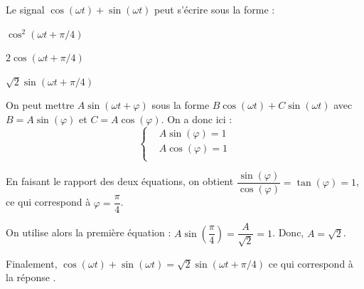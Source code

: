 \hauteurLargeurCadreReponse		{8mm}{1.5cm}
\initialisationEntrainement

Le signal $\cos(\omega t)+\sin(\omega t)$ peut s'écrire sous la forme :

\debutEntrainement


\begin{enonce}
	\begin{listeQCM3Colonnes}
	\item $\cos^2(\omega t+\pi/4)$
	\item $2\cos(\omega t+\pi/4)$
	\item $\sqrt{2}\sin(\omega t+\pi/4)$\\
	\end{listeQCM3Colonnes}
	
\end{enonce}

\reponse{\reponseC}

\begin{corrige}
On peut mettre $A\sin(\omega t+\varphi)$ sous la forme $B\cos(\omega t)+C\sin(\omega t)$ avec $B=A\sin(\varphi)$ et $C=A\cos(\varphi)$. On a donc ici : 
\begin{equation*}
\left\{\begin{aligned}
&A\sin(\varphi)=1\\
&A\cos(\varphi)=1\\
\end{aligned}\right.
\end{equation*}

En faisant le rapport des deux équations, on obtient $\dfrac{\sin(\varphi)}{\cos(\varphi)}=\tan(\varphi)=1$, ce qui correspond à $\varphi=\dfrac{\pi}{4}$. 

On utilise alors la première équation : $A\sin\left(\dfrac{\pi}{4}\right)=\dfrac{A}{\sqrt{2}}=1$. Donc, $A=\sqrt{2}$. 

Finalement, $\cos(\omega t)+\sin(\omega t)=\sqrt{2}\sin(\omega t+\pi/4)$ ce qui correspond à la réponse \reponseC . 
\end{corrige}


